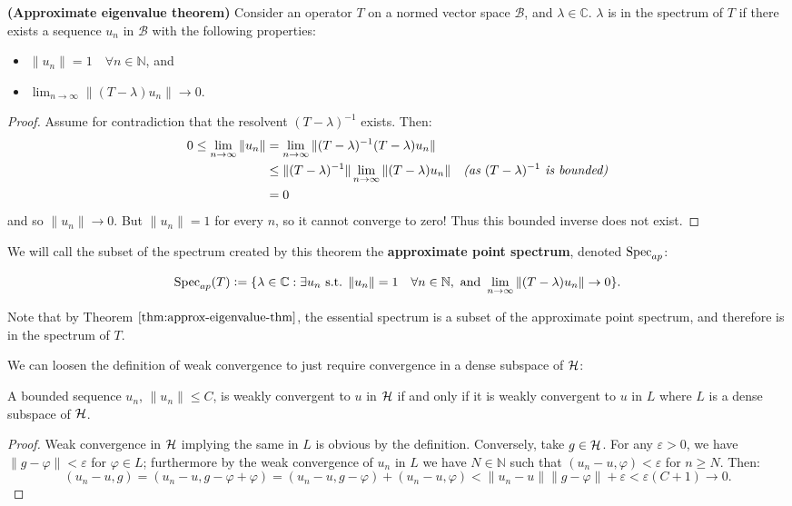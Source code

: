 \documentclass[../main.tex]{subfiles}
\begin{document}
\begin{theorem}{\textbf{(Approximate eigenvalue theorem)}}\label{thm:approx-eigenvalue-thm}
Consider an operator $T$ on a normed vector space $\mathcal{B}$, and $\lambda \in \mathbb{C}$. $\lambda$ is in the spectrum of $T$ if there exists a sequence $u_n$ in $\mathcal{B}$ with the following properties:
\begin{itemize}
\item $\|u_n\| = 1\quad \forall n \in \mathbb{N}$, and
\item $\lim_{n \rightarrow \infty}\|(T - \lambda)u_n\|  \rightarrow 0$.
\end{itemize}
\end{theorem}
\begin{proof}
Assume for contradiction that the resolvent $(T - \lambda)^{-1}$ exists. Then:
\begin{align*}
0 \leq \lim_{n \rightarrow \infty} \|u_n\| & = \lim_{n \rightarrow \infty} \|(T - \lambda)^{-1}(T - \lambda)u_n\| & \\
& \leq \|(T - \lambda)^{-1}\| \lim_{n \rightarrow \infty} \|(T - \lambda)u_n\| & \text{\emph{(as $(T - \lambda)^{-1}$ is bounded)}}\\
& = 0
\end{align*}
and so $\|u_n\| \rightarrow 0$. But $\|u_n\| = 1$ for every $n$, so it cannot converge to zero! Thus this bounded inverse does not exist.
\end{proof}
We will call the subset of the spectrum created by this theorem the \textbf{approximate point spectrum}, denoted $\mathrm{Spec}_{ap}$:

$$\mathrm{Spec}_{ap}(T) \mathrel{\mathop:}= \{ \lambda \in \mathbb{C} : \exists u_n \text{ s.t. } \|u_n\| = 1\quad \forall n \in \mathbb{N},\text{ and }\lim_{n \rightarrow \infty}\|(T - \lambda)u_n\|  \rightarrow 0\}.$$

\begin{corollary}
Note that by Theorem $\ref{thm:approx-eigenvalue-thm}$, the essential spectrum is a subset of the approximate point spectrum, and therefore
is in the spectrum of $T$.
\end{corollary}

We can loosen the definition of weak convergence to just require convergence in a dense subspace of $\mathcal{H}$:
\begin{lemma}\label{thm:weak-conv-dense-subset}
A bounded sequence $u_n$, $\|u_n\| \leq C$, is weakly convergent to $u$ in $\mathcal{H}$ if and only if it is weakly convergent to $u$ in $L$ where $L$ is a dense subspace of $\mathcal{H}$.
\end{lemma}
\begin{proof}
Weak convergence in $\mathcal{H}$ implying the same in $L$ is obvious by the definition. 
Conversely, take $g \in \mathcal{H}$. For any $\varepsilon > 0$, we have $\|g - \varphi\| < \varepsilon$ for $\varphi \in L$; furthermore by the weak convergence of $u_n$ in $L$ we have $N \in \mathbb{N}$ such that $(u_n - u, \varphi) < \varepsilon$ for $n \geq N$. Then:
$$( u_n - u, g ) = ( u_n - u, g - \varphi + \varphi ) = ( u_n - u, g - \varphi ) + ( u_n - u, \varphi ) < \|u_n - u\| \|g - \varphi\| + \varepsilon < \varepsilon(C + 1) \rightarrow 0.$$
\end{proof}
\end{document}
